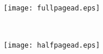 \documentclass[12pt]{article}
\begin{document}
\begin{center}

~\vfill

\texttt{[image: fullpagead.eps]}

\vfill

\end{center}

\newpage

\begin{center}

~\vfill

\texttt{[image: halfpagead.eps]}

\vfill

\end{center}
\end{document}

